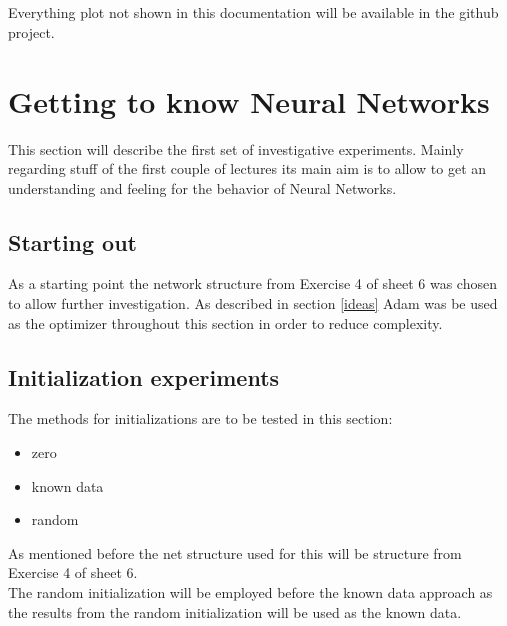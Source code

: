 \documentclass{article}
\begin{document}
\begin{multicols}{2}
\\
\\
Everything plot not shown in this documentation will be available in the github project.

\section{Getting to know Neural Networks}
This section will describe the first set of investigative experiments. Mainly regarding stuff of the first couple of lectures its main aim is to allow to get an understanding and feeling for the behavior of Neural Networks.

\subsection{Starting out}
As a starting point the network structure from Exercise 4 of sheet 6 was chosen to allow further investigation. As described in section \ref{ideas} Adam was be used as the optimizer throughout this section in order to reduce complexity.

\subsection{Initialization experiments}
The methods for initializations are to be tested in this section:
\begin{itemize}
	\item zero
	\item known data
	\item random
\end{itemize}
As mentioned before the net structure used for this will be structure from Exercise 4 of sheet 6.\\
The random initialization will be employed before the known data approach as the results from the random initialization will be used as the known data.

\end{multicols}
\end{document}
